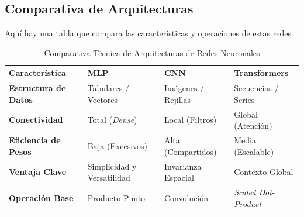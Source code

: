 \subsection{Comparativa de Arquitecturas}

Aquí hay una tabla que compara las características y operaciones de estas redes

\begin{table}[h!]
\centering
\caption{Comparativa Técnica de Arquitecturas de Redes Neuronales}
\label{tab:arquitecturas_comp}
\begin{tabular}{|l|l|l|l|}
\hline
\rowcolor[HTML]{EFEFEF} 
\textbf{Característica} & \textbf{MLP} & \textbf{CNN} & \textbf{Transformers} \\ \hline
\textbf{Estructura de Datos} & Tabulares / Vectores & Imágenes / Rejillas & Secuencias / Series \\ \hline
\textbf{Conectividad} & Total (\textit{Dense}) & Local (Filtros) & Global (Atención) \\ \hline
\textbf{Eficiencia de Pesos} & Baja (Excesivos) & Alta (Compartidos) & Media (Escalable) \\ \hline
\textbf{Ventaja Clave} & Simplicidad y Versatilidad & Invarianza Espacial & Contexto Global \\ \hline
\textbf{Operación Base} & Producto Punto & Convolución & \textit{Scaled Dot-Product} \\ \hline
\end{tabular}
\end{table}
